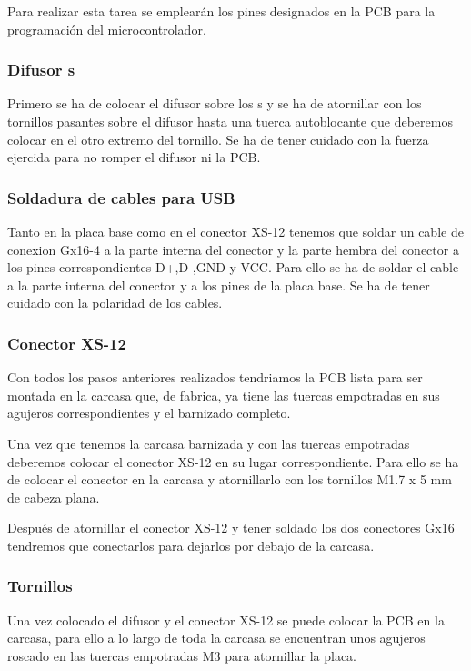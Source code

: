 Para realizar esta tarea se emplearán los pines designados en la \gls{PCB} para la programación del microcontrolador.

\subsubsection{Difusor s}
Primero se ha de colocar el difusor sobre los s y se ha de atornillar con los tornillos pasantes sobre el difusor hasta una tuerca autoblocante que deberemos colocar en el otro extremo del tornillo. Se ha de tener cuidado con la fuerza ejercida para no romper el difusor ni la \gls{PCB}.

\subsubsection{Soldadura de cables para \gls{USB}}
Tanto en la placa base como en el conector XS-12 tenemos que soldar un cable de conexion Gx16-4 a la parte interna del conector y la parte hembra del conector a los pines correspondientes D+,D-,GND y VCC. Para ello se ha de soldar el cable a la parte interna del conector y a los pines de la placa base. Se ha de tener cuidado con la polaridad de los cables.

\subsubsection{Conector XS-12}
Con todos los pasos anteriores realizados tendriamos la \gls{PCB} lista para ser montada en la carcasa que, de fabrica, ya tiene las tuercas empotradas en sus agujeros correspondientes y el barnizado completo.

Una vez que tenemos la carcasa barnizada y con las tuercas empotradas deberemos colocar el conector XS-12 en su lugar correspondiente. Para ello se ha de colocar el conector en la carcasa y atornillarlo con los tornillos M1.7 x 5 mm de cabeza plana.

Después de atornillar el conector XS-12 y tener soldado los dos conectores Gx16 tendremos que conectarlos para dejarlos por debajo de la carcasa.

\subsubsection{Tornillos} \label{Tornillos}
Una vez colocado el difusor y el conector XS-12 se puede colocar la \gls{PCB} en la carcasa, para ello a lo largo de toda la carcasa se encuentran unos agujeros roscado en las tuercas empotradas M3 para atornillar la placa.

